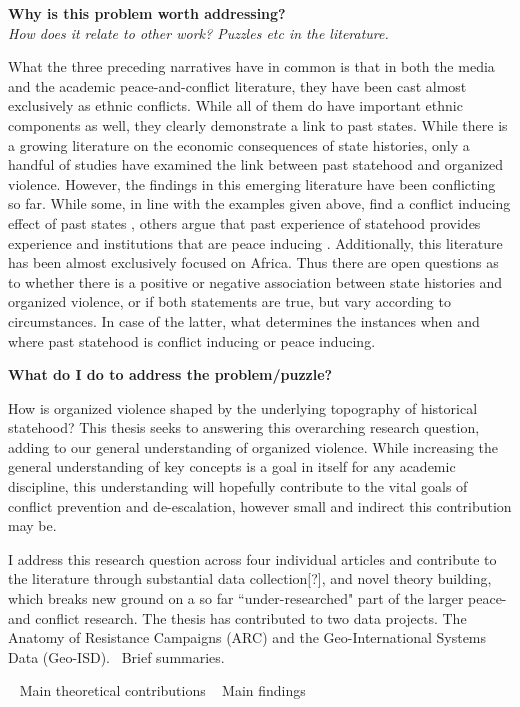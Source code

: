 \documentclass[12pt]{article}
\begin{document}
\textbf{Why is this problem worth addressing?} \\
\textit{How does it relate to other work? Puzzles etc in the literature.}

What the three preceding narratives have in common is that in both the media and
the academic peace-and-conflict literature, they have been cast almost
exclusively as ethnic conflicts. While all of them do have important ethnic
components as well, they clearly demonstrate a link to past states. While there
is a growing literature on the economic consequences of state histories, only a
handful of studies have examined the link between past statehood and organized
violence. However, the findings in this emerging literature have been
conflicting so far. While some, in line with the examples given above, find a
conflict inducing effect of past states \citep{Englebert2002, Paine2019}, others
argue that past experience of statehood provides experience and institutions
that are peace inducing \citep{Wig2016, Wig2018, Depetris-Chauvin2016}.
Additionally, this literature has been almost exclusively focused on Africa.
Thus there are open questions as to whether there is a positive or negative
association between state histories and organized violence, or if both
statements are true, but vary according to circumstances. In case of the latter,
what determines the instances when and where past statehood is conflict inducing
or peace inducing.

\textbf{What do I do to address the problem/puzzle?}

How is organized violence shaped by the underlying topography of historical
statehood? This thesis seeks to answering this overarching research question,
adding to our general understanding of organized violence. While increasing the
general understanding of key concepts is a goal in itself for any academic
discipline, this understanding will hopefully contribute to the vital goals of
conflict prevention and de-escalation, however small and indirect this
contribution may be.

I address this research question across four individual articles and contribute
to the literature through substantial data collection[?], and novel theory
building, which breaks new ground on a so far ``under-researched" part of the
larger peace- and conflict research. The thesis has contributed to two data
projects. The Anatomy of Resistance Campaigns (ARC) and the Geo-International
Systems Data (Geo-ISD). ~Brief summaries.

~ Main theoretical contributions
~ Main findings
\end{document}

